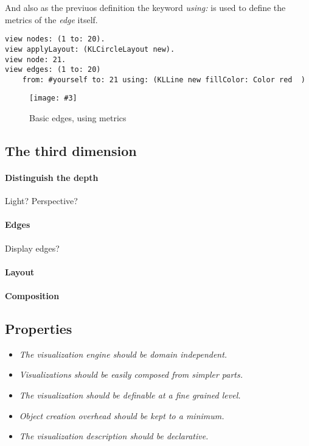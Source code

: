 \documentclass[runningheads]{llncs}
\newcommand{\fig}[4]{
	\begin{figure}[#1]
		\centering
		\texttt{[image: \#3]}
		\caption{\label{fig:#3}#4}
	\end{figure}}
\newcommand{\seclabel}[1]{\label{sec:#1}}
\begin{document}
And also as the previuos definition the keyword \emph{using:} is used
to define the metrics of the \emph{edge} itself.  
\begin{lstlisting}
view nodes: (1 to: 20).
view applyLayout: (KLCircleLayout new).	
view node: 21.
view edges: (1 to: 20) 
	from: #yourself to: 21 using: (KLLine new fillColor: Color red  )
\end{lstlisting}
\fig{}{0.5}{figure5.png}{Basic edges, using metrics}

\subsection{The third dimension} \seclabel{3d}

\paragraph{Distinguish the depth} Light? Perspective? 

\paragraph{Edges} Display edges?

\paragraph{Layout}

\paragraph{Composition}

\subsection{Properties} \seclabel{properties}

\begin{itemize}
\item \emph{The visualization engine should be domain independent.}
\item \emph{Visualizations should be easily composed from simpler parts.}
\item \emph{The visualization should be definable at a fine grained level.}
\item \emph{Object creation overhead should be kept to a minimum.}
\item \emph{The visualization description should be declarative.}
\end{itemize}
\end{document}
